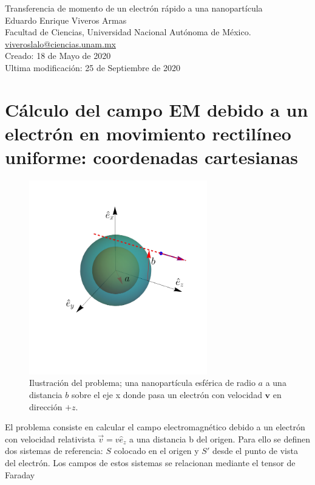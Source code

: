 \documentclass[a4paper,10pt]{article}
\begin{document}
{
 \centering
 \LARGE Transferencia de momento de un electrón rápido a una nanopartícula	\\[1.0em]
 \large Eduardo Enrique Viveros Armas\\
 \normalsize Facultad de Ciencias, Universidad Nacional Autónoma de México.\\ 
 \url{viveroslalo@ciencias.unam.mx}\\}
\large Creado: 18 de Mayo de 2020 \\
\large Ultima modificación: 25 de Septiembre de 2020\\

\section{\large{Cálculo del campo EM debido a un electrón en movimiento rectilíneo uniforme: coordenadas cartesianas}}

\setcounter{equation}{0}

\begin{figure}[htb!]
\centering
\includegraphics[width=220pt]{Figure.pdf}
\caption{Ilustración del problema; una nanopartícula esférica de radio $a$ a una distancia $b$ sobre el eje x donde pasa un electrón con velocidad $\textbf{v}$ en dirección $+z$.}
\end{figure}

\small El problema consiste en calcular el campo electromagnético debido a un electrón con velocidad relativista $\vec{v}=v\hat{e}_z$ a una distancia b del origen. Para ello se definen dos sistemas de referencia: $S$ colocado en el origen y $S'$ desde el punto de vista del electrón. Los campos de estos sistemas se relacionan mediante el tensor de Faraday 
\end{document}
